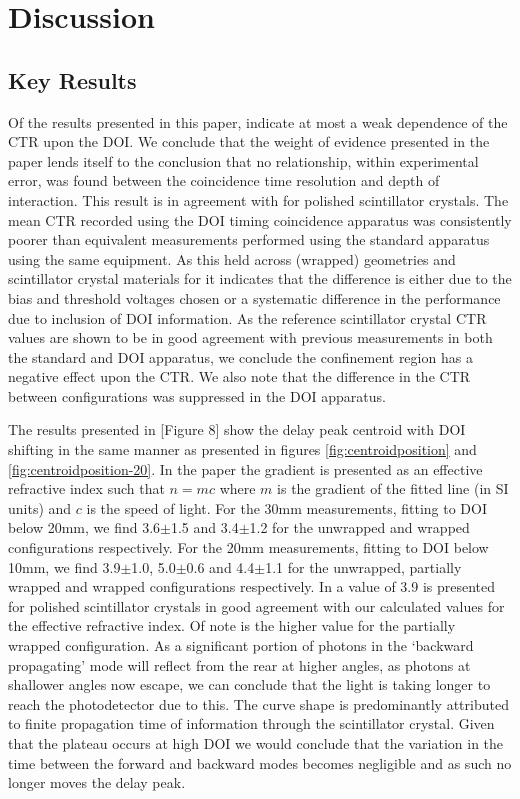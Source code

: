 \section{Discussion}
\subsection{Key Results}
Of the results presented in this paper, indicate at most a weak dependence of the CTR upon the DOI. We conclude that the weight of evidence presented in the paper lends itself to the conclusion that no relationship, within experimental error, was found between the coincidence time resolution and depth of interaction. This result is in agreement with \cite{Bircher_Shao_2012} for polished scintillator crystals. The mean CTR recorded using the DOI timing coincidence apparatus was consistently poorer than equivalent measurements performed using the standard apparatus using the same equipment. As this held across (wrapped) geometries and scintillator crystal materials for it indicates that the difference is either due to the bias and threshold voltages chosen or a systematic difference in the performance due to inclusion of DOI information. As the reference scintillator crystal CTR values are shown to be in good agreement with previous measurements in both the standard and DOI apparatus, we conclude the confinement region has a negative effect upon the CTR. We also note that the difference in the CTR between configurations was suppressed in the DOI apparatus.

The results presented in [Figure 8]\cite{Moses_Derenzo_1999} show the delay peak centroid with DOI shifting in the same manner as presented in figures \ref{fig:centroidposition} and \ref{fig:centroidposition-20}. In the paper the gradient is presented as an effective refractive index such that $n=mc$ where $m$ is the gradient of the fitted line (in SI units) and $c$ is the speed of light. For the 30mm measurements, fitting to DOI below 20mm, we find 3.6$\pm$1.5 and 3.4$\pm$1.2 for the unwrapped and wrapped configurations respectively.  For the 20mm measurements, fitting to DOI below 10mm, we find 3.9$\pm$1.0, 5.0$\pm$0.6 and 4.4$\pm$1.1 for the unwrapped, partially wrapped and wrapped configurations respectively. In \cite{Moses_Derenzo_1999} a value of 3.9 is presented for polished scintillator crystals in good agreement with our calculated values for the effective refractive index. Of note is the higher value for the partially wrapped configuration. As a significant portion of photons in the `backward propagating' mode will reflect from the rear at higher angles, as photons at shallower angles now escape, we can conclude that the light is taking longer to reach the photodetector due to this. The curve shape is predominantly attributed to finite propagation time of information through the scintillator crystal. Given that the plateau occurs at high DOI we would conclude that the variation in the time between the forward and backward modes becomes negligible and as such no longer moves the delay peak.

